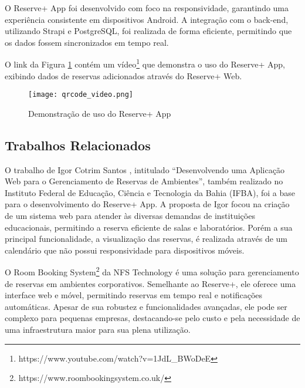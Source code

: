 \documentclass[12pt]{article}
\begin{document}


O Reserve+ App foi desenvolvido com foco na responsividade, garantindo uma experiência consistente em dispositivos Android. A integração com o back-end, utilizando Strapi e PostgreSQL, foi realizada de forma eficiente, permitindo que os dados fossem sincronizados em tempo real.

O link da Figura \ref{fig:qrcode-video} contém um vídeo\footnote{https://www.youtube.com/watch?v=1JdL_BWoDeE} que demonstra o uso do Reserve+ App, exibindo dados de reservas adicionados através do Reserve+ Web.

\begin{figure}[!htb]
\centering
\texttt{[image: qrcode\_video.png]}
\caption{Demonstração de uso do Reserve+ App}
\label{fig:qrcode-video}
\end{figure}

\subsection{Trabalhos Relacionados} \label{sec:related-work}

O trabalho de Igor Cotrim Santos \cite{cotrim}, intitulado ``Desenvolvendo uma Aplicação Web para o Gerenciamento de Reservas de Ambientes'', também realizado no Instituto Federal de Educação, Ciência e Tecnologia da Bahia (IFBA), foi a base para o desenvolvimento do Reserve+ App. A proposta de Igor focou na criação de um sistema web para atender às diversas demandas de instituições educacionais, permitindo a reserva eficiente de salas e laboratórios. Porém a sua principal funcionalidade, a visualização das reservas, é realizada através de um calendário que não possui responsividade para dispositivos móveis. 

O Room Booking System\footnote{https://www.roombookingsystem.co.uk/} da NFS Technology é uma solução para gerenciamento de reservas em ambientes corporativos. Semelhante ao Reserve+, ele oferece uma interface web e móvel, permitindo reservas em tempo real e notificações automáticas. Apesar de sua robustez e funcionalidades avançadas, ele pode ser complexo para pequenas empresas, destacando-se pelo custo e pela necessidade de uma infraestrutura maior para sua plena utilização.
\end{document}
